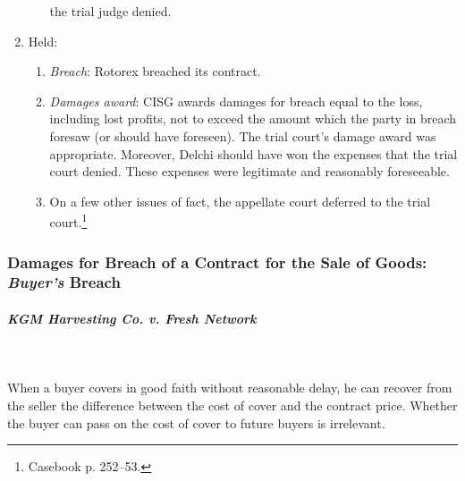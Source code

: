 \begin{enumerate}
\begin{enumerate}
        the trial judge denied.
    \end{enumerate}
    \item Held:
    \begin{enumerate}
        \item \emph{Breach}: Rotorex breached its contract.
        \item \emph{Damages award}: CISG awards damages for breach equal to 
        the loss, including lost profits, not to exceed the amount which the 
        party in breach foresaw (or should have foreseen). The trial court's 
        damage award was appropriate. Moreover, Delchi should have won the 
        expenses that the trial court denied. These expenses were legitimate 
        and reasonably foreseeable.
        \item On a few other issues of fact, the appellate court deferred to 
        the trial court.\footnote{Casebook p. 252--53.}
    \end{enumerate}
\end{enumerate}

\subsubsection{Damages for Breach of a Contract for the Sale of Goods: 
\emph{Buyer's} Breach}

\paragraph{\emph{KGM Harvesting Co. v. Fresh Network}}
~\\\\
When a buyer covers in good faith without reasonable delay, he can recover 
from the seller the difference between the cost of cover and the contract 
price. Whether the buyer can pass on the cost of cover to future buyers is 
irrelevant.

